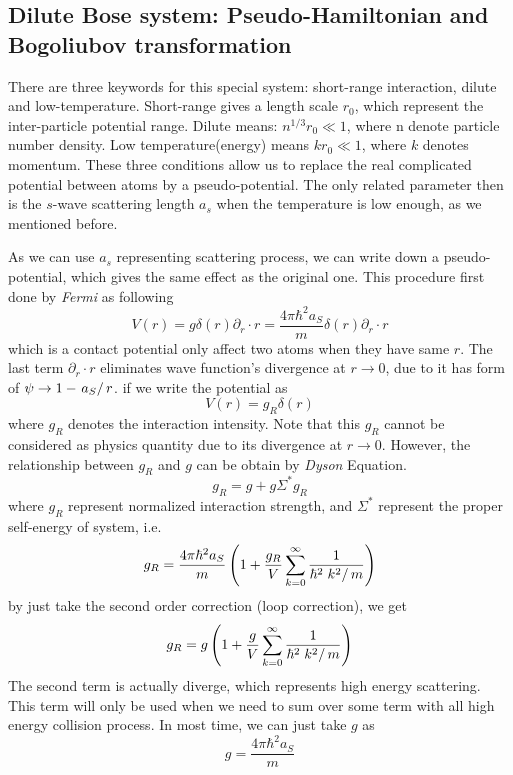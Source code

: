 \subsection{Dilute Bose system: Pseudo-Hamiltonian and Bogoliubov transformation}

There are three keywords for this special system: short-range interaction, dilute and low-temperature. Short-range gives a length scale $r_0$, which represent the inter-particle potential range. Dilute means: $n^{1/3}r_0 \ll 1$, where n denote particle number density. Low temperature(energy) means $k r_0 \ll 1$, where $k$ denotes momentum. These three conditions allow us to replace the real complicated potential between atoms by a pseudo-potential. The only related parameter then is the $s$-wave scattering length $a_s$ when the temperature is low enough, as we mentioned before.

As we can use $a_s$ representing scattering process, we can write down a pseudo-potential, which gives the same effect as the original one. This procedure first done by \textit{Fermi} as following
\begin{equation}
V(r)=g \delta (r)\partial _r\cdot r=\frac{4\pi\hbar^2a_S}{m}\delta (r)\partial _r\cdot r
\end{equation}
which is a contact potential only affect two atoms when they have same $r$. The last term $\partial _r\cdot r$ eliminates wave function's divergence at $r\to 0$, due to it has form of $\psi \to 1-\left.a_S\right/r$. if we write the potential as
\begin{equation}
V(r)=g_R\delta (r)
\end{equation}
where $g_R$ denotes the interaction intensity. Note that this $g_R$ cannot be considered as physics quantity due to its divergence at $r\to 0$. However, the relationship between $g_R$ and $g$ can be obtain by \textit{Dyson} Equation.
\begin{equation}
g_R=g+g \Sigma ^* g_R
\end{equation}
where $g_R$ represent normalized interaction strength, and $\Sigma^*$ represent the proper self-energy of system, i.e.
\begin{equation}
g_R=\frac{4\pi  \hbar ^2a_S}{m}\left(1+\frac{g_R}{V}\sum _{k=0}^{\infty } \frac{1}{\hbar ^2\left.k^2\right/m}\right)
\end{equation}
by just take the second order correction (loop correction), we get
\begin{equation}
\label{gRRe}
g_R=g\left(1+\frac{g}{V}\sum _{k=0}^{\infty } \frac{1}{\hbar ^2\left.k^2\right/m}\right)
\end{equation}
The second term is actually diverge, which represents high energy scattering. This term will only be used when we need to sum over some term with all high energy collision process. In most time, we can just take $g$ as
\begin{equation}
g=\frac{4\pi  \hbar ^2a_S}{m}
\end{equation}

